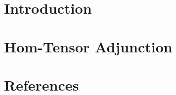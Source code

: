

%









	\begin{frame}
		\titlepage
	\end{frame}
	
	\section{Introduction}
	
	
	\section{Hom-Tensor Adjunction}	
		
	
	\section{References}
	
	
